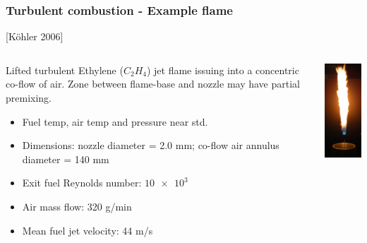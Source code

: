 \documentclass{beamer}
\begin{document}
\begin{frame}%
\frametitle{Turbulent combustion - Example flame}
\scriptsize
[K{\"o}hler 2006] \cite{Kohler, AdelaideISF}
\begin{minipage}[0.5\textheight]{\textwidth}
\begin{columns}[T]
\begin{column}{0.65\textwidth}
\vspace{10pt}

\tiny{Lifted turbulent Ethylene ($C_2H_4$) jet flame issuing into a concentric co-flow of air.
Zone between flame-base and nozzle may have partial premixing.  }
\begin{itemize}%
\tiny
\item Fuel temp, air temp and pressure near std.
\item Dimensions: nozzle diameter = 2.0 mm; co-flow air annulus diameter = 140 mm\\
\item Exit fuel Reynolds number: $\num{10e3}$
\item Air mass flow: 320 g/min 
\item Mean fuel jet velocity: 44 m/s 
\end{itemize}
\end{column}
\begin{column}{0.3\textwidth}
\vspace{0pt}
\includegraphics[height=1\textwidth]{./figs/dlrflame.png}
\end{column}
\end{columns}
\end{minipage}


\end{frame}
\end{document}
